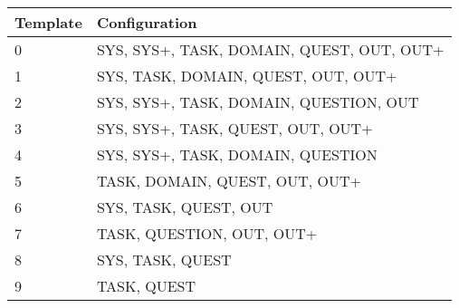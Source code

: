 \begin{tabular*}{\textwidth}{@{\extracolsep{\fill}}ll}
     \toprule
     \textbf{Template} & \textbf{Configuration}  \\
     \midrule
     0 & SYS, SYS+, TASK, DOMAIN, QUEST, OUT, OUT+\\
     1 & SYS, TASK, DOMAIN, QUEST, OUT, OUT+\\
     2 & SYS, SYS+, TASK, DOMAIN, QUESTION, OUT\\
     3 & SYS, SYS+, TASK, QUEST, OUT, OUT+\\
     4 & SYS, SYS+, TASK, DOMAIN, QUESTION\\
     5 & TASK, DOMAIN, QUEST, OUT, OUT+\\
     6 & SYS, TASK, QUEST, OUT\\
     7 & TASK, QUESTION, OUT, OUT+\\
     8 & SYS, TASK, QUEST\\
     9 & TASK, QUEST\\
     \bottomrule
\end{tabular*}